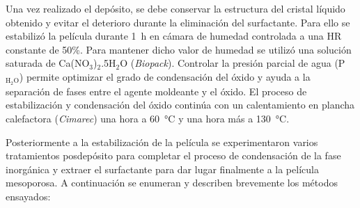 		Una vez realizado el depósito, se debe conservar la estructura del cristal líquido obtenido y evitar el deterioro durante la eliminación del surfactante. Para ello se estabilizó la película durante \SI{1}{\hour} en cámara de humedad controlada a una HR constante de 50\%. Para mantener dicho valor de humedad se utilizó una solución saturada de Ca(NO$_3$)$_2$.5H$_2$O (\textit{Biopack}). Controlar la presión parcial de agua (P$_{\text{H}_2\text{O}}$) permite optimizar el grado de condensación del óxido y ayuda a la separación de fases entre el agente moldeante y el óxido\cite{Crepaldi2003}. El proceso de estabilización y condensación del óxido continúa con un calentamiento en plancha calefactora (\textit{Cimarec}) una hora a \SI{60}{\celsius} y una hora más a \SI{130}{\celsius}\cite{Crepaldi2003,Crepaldi2002a}. 
				
		Posteriormente a la estabilización de la película se experimentaron varios tratamientos posdepósito para completar el proceso de condensación de la fase inorgánica y extraer el surfactante para dar lugar finalmente a la película mesoporosa. A continuación se enumeran y describen brevemente los métodos ensayados:


